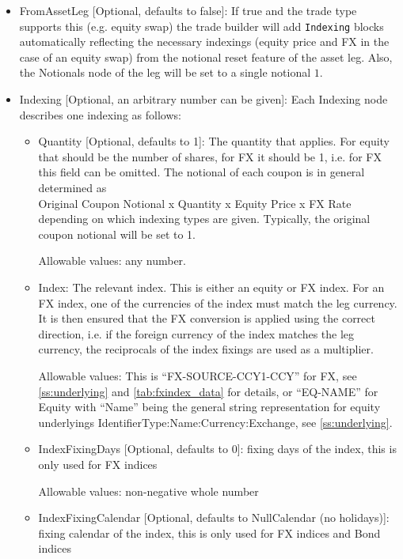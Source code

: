 \begin{itemize}
\item FromAssetLeg [Optional, defaults to false]: If true and the trade type supports this (e.g. equity swap) the trade
  builder will add \verb+Indexing+ blocks automatically reflecting the necessary indexings (equity price and FX in the
  case of an equity swap) from the notional reset feature of the asset leg. Also, the Notionals node of the leg will be
  set to a single notional $1$.
\item Indexing [Optional, an arbitrary number can be given]: Each Indexing node describes one indexing as follows:

\begin{itemize}

\item Quantity [Optional, defaults to 1]: The quantity that applies. For equity that should be the number of shares, for
  FX it should be 1, i.e. for FX this field can be omitted. The notional of each coupon is
  in general determined as\\
  Original Coupon Notional x Quantity x Equity Price x FX Rate\\
  depending on which indexing types are given. Typically, the original coupon notional will be set to 1.

  Allowable values: any number.

\item Index: The relevant index. This is either an equity or FX index. For an FX index, one of the currencies of the
  index must match the leg currency. It is then ensured that the FX conversion is applied using the correct direction,
  i.e. if the foreign currency of the index matches the leg currency, the reciprocals of the index fixings are used as a
  multiplier.

  Allowable values: This is ``FX-SOURCE-CCY1-CCY'' for FX, see \ref{ss:underlying} and \ref{tab:fxindex_data} for
  details, or ``EQ-NAME'' for Equity with ``Name'' being the general string representation for equity underlyings
  {IdentifierType}:{Name}:{Currency}:{Exchange}, see \ref{ss:underlying}.

\item IndexFixingDays [Optional, defaults to 0]: fixing days of the index, this is only used for FX indices

  Allowable values: non-negative whole number

\item IndexFixingCalendar [Optional, defaults to NullCalendar (no holidays)]: fixing calendar of the index, this is only
  used for FX indices and Bond indices


\end{itemize}
\end{itemize}
